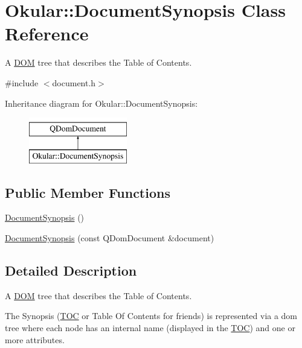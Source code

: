 \hypertarget{classOkular_1_1DocumentSynopsis}{\section{Okular\+:\+:Document\+Synopsis Class Reference}
\label{classOkular_1_1DocumentSynopsis}
}


A \hyperlink{namespaceDOM}{D\+O\+M} tree that describes the Table of Contents.  




{\ttfamily \#include $<$document.\+h$>$}

Inheritance diagram for Okular\+:\+:Document\+Synopsis\+:\begin{figure}[H]
\begin{center}
\leavevmode
\includegraphics[height=2.000000cm]{classOkular_1_1DocumentSynopsis}
\end{center}
\end{figure}
\subsection*{Public Member Functions}
\begin{DoxyCompactItemize}
\item 
\hyperlink{classOkular_1_1DocumentSynopsis_aa6052ddb1676af69f25acb4a7c99e416}{Document\+Synopsis} ()
\item 
\hyperlink{classOkular_1_1DocumentSynopsis_a54e8db96b1c4971f8741420e6a6341a1}{Document\+Synopsis} (const Q\+Dom\+Document \&document)
\end{DoxyCompactItemize}


\subsection{Detailed Description}
A \hyperlink{namespaceDOM}{D\+O\+M} tree that describes the Table of Contents. 

The Synopsis (\hyperlink{classTOC}{T\+O\+C} or Table Of Contents for friends) is represented via a dom tree where each node has an internal name (displayed in the \hyperlink{classTOC}{T\+O\+C}) and one or more attributes.

